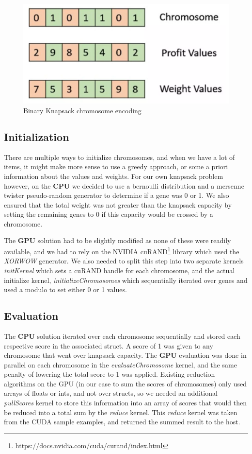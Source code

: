 \documentclass[11pt]{article}       %
\begin{document}
\begin{figure}[h]
    \centering
    \includegraphics[width=0.5\linewidth]{Figures/knapsack_representation.png}
    \caption{Binary Knapsack chromosome encoding}
    \label{fig:encoding}
\end{figure}

\subsection{Initialization}
There are multiple ways to initialize chromosomes, and when we have a lot of items, it might make more sense to use a greedy approach, or some a priori information about the values and weights. For our own knapsack problem however, on the \textbf{CPU} we decided to use a bernoulli distribution and a mersenne twister pseudo-random generator to determine if a gene was 0 or 1. We also ensured that the total weight was not greater than the knapsack capacity by setting the remaining genes to 0 if this capacity would be crossed by a chromosome.

The \textbf{GPU} solution had to be slightly modified as none of these were readily available, and we had to rely on the NVIDIA cuRAND\footnote[1]{https://docs.nvidia.com/cuda/curand/index.html} library which used the \textit{XORWOW} generator. We also needed to split this step into two separate kernels \textit{initKernel} which sets a cuRAND handle for each chromosome, and the actual initialize kernel, \textit{initializeChromosomes} which sequentially iterated over genes and used a modulo to set either 0 or 1 values.

\subsection{Evaluation}
The \textbf{CPU} solution iterated over each chromosome sequentially and stored each respective score in the associated struct. A score of 1 was given to any chromosome that went over knapsack capacity.
The \textbf{GPU} evaluation was done in parallel on each chromosome in the  \textit{evaluateChromosome} kernel, and the same penalty of lowering the total score to 1 was applied. Existing reduction algorithms on the GPU (in our case to sum the scores of chromosomes) only used arrays of floats or ints, and not over structs, so we needed an additional \textit{pullScores} kernel to store this information into an array of scores that would then be reduced into a total sum by the \textit{reduce} kernel. This \textit{reduce} kernel was taken from the CUDA sample examples, and returned the summed result to the host.
\end{document}
